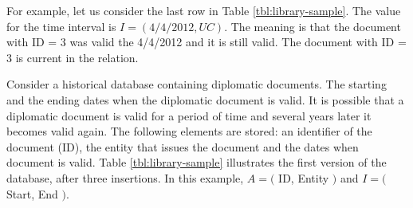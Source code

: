 
For example, let us consider the last row in Table \ref{tbl:library-sample}. The value for the time interval is $I = \left(4/4/2012 , UC \right)$. The meaning is that the document with ID = 3 was valid the  4/4/2012 and it is still valid. The document with ID = 3 is current in the relation.


\begin{example}
\label{ex:library-database}
 Consider a historical database containing diplomatic documents. The starting and the ending dates when the diplomatic document is valid. It is possible that a diplomatic document is valid for a period of time and several years later it becomes valid again. The following elements are stored: an identifier of the document (ID), the entity that issues the document and the dates when document is valid. Table \ref{tbl:library-sample} illustrates the first version of the database, after three insertions. In this example, $A = ($ ID, Entity $)$ and $I = ($ Start, End $)$.
\end{example}



